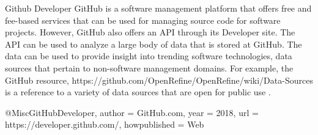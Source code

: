Github Developer
GitHub is a software management platform that offers free and fee-based services that can be used for managing source code for software projects.  However, GitHub also offers an API through its Developer site.  The API can be used to analyze a large body of data that is stored at GitHub.  The data can be used to provide insight into trending software technologies, data sources that pertain to non-software management domains.  For example, the GitHub resource, https://github.com/OpenRefine/OpenRefine/wiki/Data-Sources is a reference to a variety of data sources that are open for public use \cite{GitHubDeveloper}.

@Misc{GitHubDeveloper,
    author = {GitHub.com},
    year = {2018},
    url = {https://developer.github.com/},
    howpublished = {Web}
}
